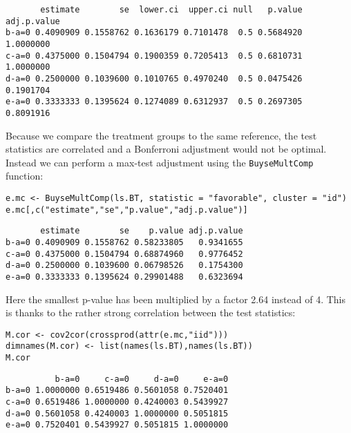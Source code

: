 \documentclass[12pt]{article}
\begin{document}
\begin{verbatim}
       estimate        se  lower.ci  upper.ci null   p.value adj.p.value
b-a=0 0.4090909 0.1558762 0.1636179 0.7101478  0.5 0.5684920   1.0000000
c-a=0 0.4375000 0.1504794 0.1900359 0.7205413  0.5 0.6810731   1.0000000
d-a=0 0.2500000 0.1039600 0.1010765 0.4970240  0.5 0.0475426   0.1901704
e-a=0 0.3333333 0.1395624 0.1274089 0.6312937  0.5 0.2697305   0.8091916
\end{verbatim}



Because we compare the treatment groups to the same reference, the
test statistics are correlated and a Bonferroni adjustment would not
be optimal. Instead we can perform a max-test adjustment using the
\texttt{BuyseMultComp} function:
\lstset{language=r,label= ,caption= ,captionpos=b,numbers=none}
\begin{lstlisting}
e.mc <- BuyseMultComp(ls.BT, statistic = "favorable", cluster = "id")
e.mc[,c("estimate","se","p.value","adj.p.value")]
\end{lstlisting}

\begin{verbatim}
       estimate        se    p.value adj.p.value
b-a=0 0.4090909 0.1558762 0.58233805   0.9341655
c-a=0 0.4375000 0.1504794 0.68874960   0.9776452
d-a=0 0.2500000 0.1039600 0.06798526   0.1754300
e-a=0 0.3333333 0.1395624 0.29901488   0.6323694
\end{verbatim}


Here the smallest p-value has been multiplied by a factor 2.64 instead
of 4. This is thanks to the rather strong correlation between the test
statistics:
\lstset{language=r,label= ,caption= ,captionpos=b,numbers=none}
\begin{lstlisting}
M.cor <- cov2cor(crossprod(attr(e.mc,"iid")))
dimnames(M.cor) <- list(names(ls.BT),names(ls.BT))
M.cor
\end{lstlisting}

\begin{verbatim}
          b-a=0     c-a=0     d-a=0     e-a=0
b-a=0 1.0000000 0.6519486 0.5601058 0.7520401
c-a=0 0.6519486 1.0000000 0.4240003 0.5439927
d-a=0 0.5601058 0.4240003 1.0000000 0.5051815
e-a=0 0.7520401 0.5439927 0.5051815 1.0000000
\end{verbatim}
\end{document}
